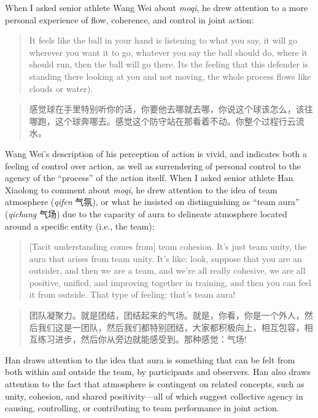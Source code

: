 \begin{CJK}{UTF8}{gbsn}
When I asked senior athlete Wang Wei about \textit{moqi}, he drew attention to a more personal experience of flow, coherence, and control in joint action:

  \begin{quote}
    It feels like the ball in your hand is listening to what you say, it will go wherever you want it to go, whatever you say the ball should do, where it should run, then the ball will go there.  Its the feeling that this defender is standing there looking at you and not moving, the whole process flows like clouds or water).
  \end{quote}

  \begin{quote}
        感觉球在手里特别听你的话，你要他去哪就去哪，你说这个球该怎么，该往哪跑，这个球奔哪去。感觉这个防守站在那看着不动。你整个过程行云流水。
  \end{quote}

Wang Wei's description of his perception of action is vivid, and indicates both a feeling of control over action, as well as surrendering of personal control to the agency of the ``process'' of the action itself.  When I asked senior athlete Han Xiaolong to comment about \textit{moqi}, he drew attention to the idea of team atmosphere (\textit{qifen} 气氛), or what he insisted on distinguishing as ``team aura'' (\textit{qichang} 气场) due to the capacity of aura to delineate atmosphere located around a specific entity (i.e., the team):

    \begin{quote}
      [Tacit understanding comes from] team cohesion.  It's just team unity, the aura that arises from team unity.  It's like: look, suppose that you are an outsider, and then we are a team, and we're all really cohesive, we are all positive, unified, and improving together in training, and then you can feel it from outside.  That type of feeling: that's team aura!
    \end{quote}

    \begin{quote}
      团队凝聚力。就是团结，团结起来的气场。就是，你看，你是一个外人，然后我们这是一团队，然后我们都特别团结，大家都积极向上，相互包容，相互练习进步，然后你从旁边就能感受到。那种感觉：气场!
    \end{quote}

Han draws attention to the idea that aura is something that can be felt from both within and outside the team, by participants and observers.  Han also draws attention to the fact that atmosphere is contingent on related concepts, such as unity, cohesion, and shared positivity---all of which suggest collective agency in causing, controlling, or contributing to team performance in joint action.


\end{CJK}
